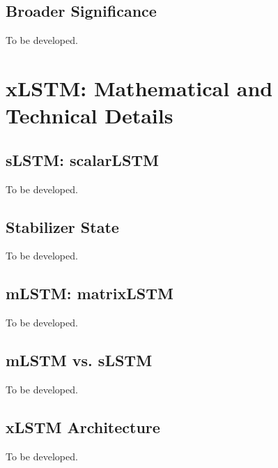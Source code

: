 \documentclass[11pt, oneside]{book}
\let\originalsection\section
\renewcommand{\section}{\Needspace{7\baselineskip}\originalsection}
\let\originalsubsection\subsection
\renewcommand{\subsection}{\Needspace{6\baselineskip}\originalsubsection}
\begin{document}
\subsection{Broader Significance}\label{sec:source-8-1-10}
{\small\color{gray!70!black} To be developed.}

\section{xLSTM: Mathematical and Technical Details}\label{sec:source-8-2}

\subsection{sLSTM: scalarLSTM}\label{sec:source-8-2-1}
{\small\color{gray!70!black} To be developed.}

\subsection{Stabilizer State}\label{sec:source-8-2-2}
{\small\color{gray!70!black} To be developed.}

\subsection{mLSTM: matrixLSTM}\label{sec:source-8-2-3}
{\small\color{gray!70!black} To be developed.}

\subsection{mLSTM vs. sLSTM}\label{sec:source-8-2-4}
{\small\color{gray!70!black} To be developed.}

\subsection{xLSTM Architecture}\label{sec:source-8-2-5}
{\small\color{gray!70!black} To be developed.}
\end{document}
